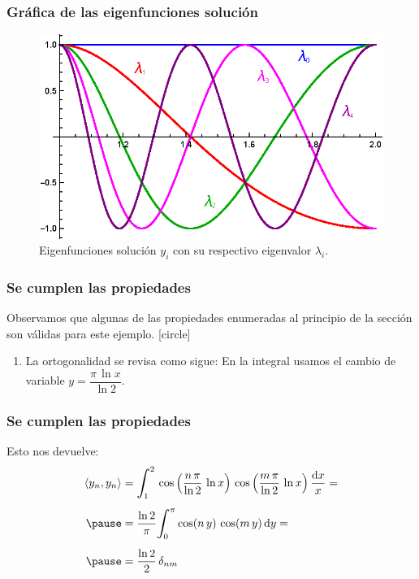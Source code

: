 \documentclass[12pt]{beamer}
\begin{document}
\begin{frame}
\frametitle{Gráfica de las eigenfunciones solución}
\begin{figure}
  \centering
  \includegraphics[scale=1.1]{Imagenes/Plot_Ejercicio_SL_03.eps}
  \caption{Eigenfunciones solución $y_{i}$ con su respectivo eigenvalor $\lambda_{i}$.}
  \label{fig:figura_04_02}
\end{figure}
\end{frame}
\begin{frame}
\frametitle{Se cumplen las propiedades}
Observamos que algunas de las propiedades enumeradas al principio de la sección son válidas para este ejemplo.
\pause
{}
[circle]
\begin{enumerate}[<+->]
\conti
\item La ortogonalidad se revisa como sigue: En la integral usamos el cambio de variable $y = \dfrac{\pi \, \ln x}{\ln 2}$.
\end{enumerate}
\end{frame}
\begin{frame}
\frametitle{Se cumplen las propiedades}
Esto nos devuelve:
\pause
\begin{eqnarray}
\begin{aligned}[b]
\langle y_{n}, y_{n} \rangle &= \scaleint{6ex}_{\bs 1}^{2} \, \cos \left( \dfrac{n \, \pi}{\ln 2} \, \ln x \right) \, \cos \left( \dfrac{m \, \pi}{\ln 2} \, \ln x \right) \dfrac{\dd{x}}{x} = \\[0.5em] \pause
&= \dfrac{\ln 2}{\pi} \scaleint{6ex}_{\bs 0}^{\pi} \cos (n \, y) \, \cos (m \, y) \dd{y} = \\[0.5em] \pause
&= \dfrac{\ln 2}{2} \, \delta_{nm}
\end{aligned}
\label{eq:ecuacion_04_16}
\end{eqnarray}
\end{frame}                
\end{document}
